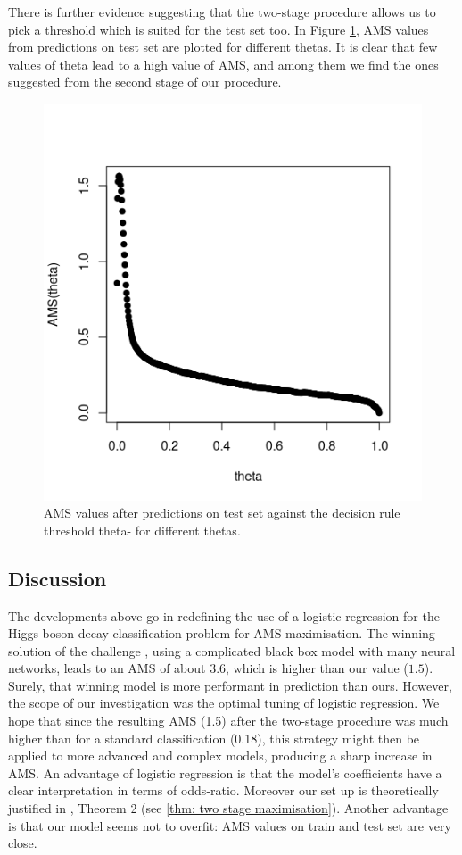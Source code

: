 \documentclass[]{article}
\begin{document}
There is further evidence suggesting that the two-stage procedure allows us to pick a threshold which is suited for the test set too. In Figure \ref{fig: AMS on test}, AMS values from predictions on test set are plotted for different thetas. It is clear that few values of theta lead to a high value of AMS, and among them we find the ones suggested from the second stage of our procedure. 

\begin{figure}[H]
\centering
\includegraphics[scale=0.7]{../Pictures/testbadpractice.png}
\caption{AMS values after predictions on test set against the decision rule threshold theta- for different thetas.}
\label{fig: AMS on test}
\end{figure}

\subsection{Discussion}


The developments above go in redefining the use of a logistic regression for the Higgs boson decay classification problem for AMS maximisation. The winning solution of the challenge \cite{melis2014winning}, using a complicated black box model with many neural networks, leads to an AMS of about $3.6$, which is higher than our value ($1.5$). Surely, that winning model is more performant in prediction than ours. However, the scope of our investigation was the optimal tuning of logistic regression. We hope that since the resulting AMS (1.5) after the two-stage procedure was much higher than for a standard classification (0.18), this strategy might then be applied to more advanced and complex models, producing a sharp increase in AMS. An advantage of logistic regression is that the model's coefficients have a clear interpretation in terms of odds-ratio. Moreover our set up is theoretically justified in \cite{kotlowski2014consistent}, Theorem 2 (see \ref{thm: two stage maximisation}). Another advantage is that our model seems not to overfit: AMS values on train and test set are very close.




\end{document}
